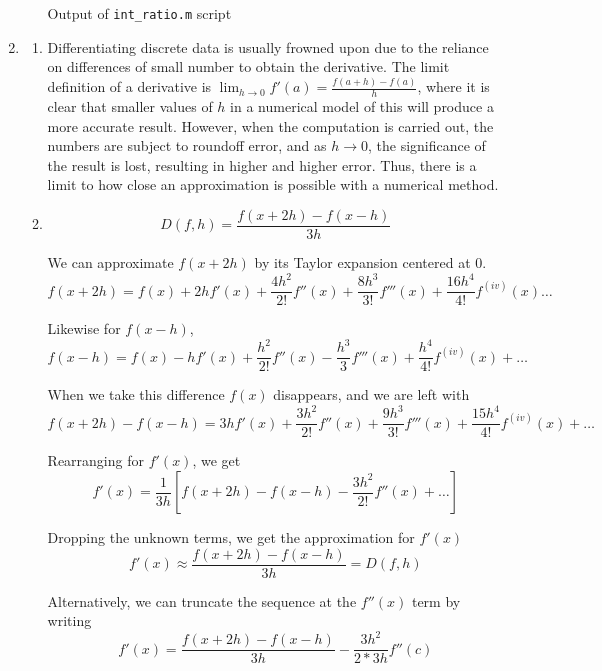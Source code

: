 \documentclass[11pt]{article}
\begin{document}
\begin{enumerate}
\begin{enumerate}[(a)]
		\medskip

		\begin{center}
		Output of \texttt{int\_ratio.m} script
		\end{center}
		

		\medskip

	\end{enumerate}

	\item

	\begin{enumerate}

		\item Differentiating discrete data is usually frowned upon due to the reliance on differences of small number to obtain the derivative. The limit definition of a derivative is $\lim_{h\to0}f'(a) = \frac{f(a+h)-f(a)}{h}$, where it is clear that smaller values of $h$ in a numerical model of this will produce a more accurate result. However, when the computation is carried out, the numbers are subject to roundoff error, and as $h\to0$, the significance of the result is lost, resulting in higher and higher error. Thus, there is a limit to how close an approximation is possible with a numerical method.

		\medskip

		\item \[D(f,h) = \frac{f(x+2h) - f(x-h)}{3h}\]

		We can approximate $f(x+2h)$ by its Taylor expansion centered at 0.
		\[
		f(x+2h) = f(x) + 2hf'(x) + \frac{4h^2}{2!}f''(x) + \frac{8h^3}{3!}f'''(x) + \frac{16h^4}{4!}f^{(iv)}(x)\ldots
		\]

		Likewise for $f(x-h)$,
		\[
		f(x-h) = f(x) - hf'(x) + \frac{h^2}{2!}f''(x) - \frac{h^3}{3}f'''(x) + \frac{h^4}{4!}f^{(iv)}(x) + \ldots
		\]

		When we take this difference $f(x)$ disappears, and we are left with
		\[
		f(x+2h) - f(x-h) = 3hf'(x) + \frac{3h^2}{2!}f''(x) + \frac{9h^3}{3!}f'''(x) + \frac{15h^4}{4!}f^{(iv)}(x) + \ldots
		\]

		Rearranging for $f'(x)$, we get
		\[
		f'(x) = \frac{1}{3h}[f(x+2h)-f(x-h)-\frac{3h^2}{2!}f''(x) + \ldots]
		\]

		Dropping the unknown terms, we get the approximation for $f'(x)$
		\[
		f'(x) \approx \frac{f(x+2h)-f(x-h)}{3h} = D(f,h)
		\]

		Alternatively, we can truncate the sequence at the $f''(x)$ term by writing
		\[
		f'(x) = \frac{f(x+2h) - f(x-h)}{3h} - \frac{3h^2}{2*3h}f''(c)
		\]


\end{enumerate}
\end{enumerate}
\end{document}
